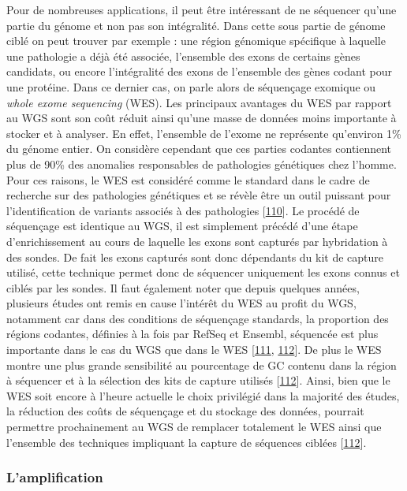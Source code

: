 \documentclass[12pt,a4paper,twoside]{ugathesis}
\theoremstyle{definition}
\theoremstyle{definition}
\theoremstyle{definition}
\theoremstyle{remark}
\begin{document}
Pour de nombreuses applications, il peut être intéressant de ne
séquencer qu'une partie du génome et non pas son intégralité. Dans cette
sous partie de génome ciblé on peut trouver par exemple : une région
génomique spécifique à laquelle une pathologie a déjà été associée,
l'ensemble des exons de certains gènes candidats, ou encore
l'intégralité des exons de l'ensemble des gènes codant pour une
protéine. Dans ce dernier cas, on parle alors de séquençage exomique ou
\emph{whole exome sequencing} (WES). Les principaux avantages du WES par
rapport au WGS sont son coût réduit ainsi qu'une masse de données moins
importante à stocker et à analyser. En effet, l'ensemble de l'exome ne
représente qu'environ 1\% du génome entier. On considère cependant que
ces parties codantes contiennent plus de 90\% des anomalies responsables
de pathologies génétiques chez l'homme. Pour ces raisons, le WES est
considéré comme le standard dans le cadre de recherche sur des
pathologies génétiques et se révèle être un outil puissant pour
l'identification de variants associés à des pathologies
{[}\protect\hyperlink{ref-Ng2010}{110}{]}. Le procédé de séquençage est
identique au WGS, il est simplement précédé d'une étape d'enrichissement
au cours de laquelle les exons sont capturés par hybridation à des
sondes. De fait les exons capturés sont donc dépendants du kit de
capture utilisé, cette technique permet donc de séquencer uniquement les
exons connus et ciblés par les sondes. Il faut également noter que
depuis quelques années, plusieurs études ont remis en cause l'intérêt du
WES au profit du WGS, notamment car dans des conditions de séquençage
standards, la proportion des régions codantes, définies à la fois par
RefSeq et Ensembl, séquencée est plus importante dans le cas du WGS que
dans le WES {[}\protect\hyperlink{ref-Lelieveld2015}{111},
\protect\hyperlink{ref-Meienberg2016}{112}{]}. De plus le WES montre une
plus grande sensibilité au pourcentage de GC contenu dans la région à
séquencer et à la sélection des kits de capture utilisés
{[}\protect\hyperlink{ref-Meienberg2016}{112}{]}. Ainsi, bien que le WES
soit encore à l'heure actuelle le choix privilégié dans la majorité des
études, la réduction des coûts de séquençage et du stockage des données,
pourrait permettre prochainement au WGS de remplacer totalement le WES
ainsi que l'ensemble des techniques impliquant la capture de séquences
ciblées {[}\protect\hyperlink{ref-Meienberg2016}{112}{]}.

\subsubsection{L'amplification}\label{lamplification}
\end{document}
